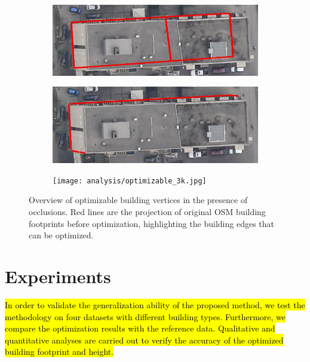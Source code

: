 \begin{figure}[H]
    \centering
       \begin{subfigure}[tbp]{0.43\columnwidth}
           \centering
           
           \includegraphics[width=\textwidth]{analysis/proj_3k.png}
           \caption[]{}
           {{\small }} 
           \label{fig:3a}
       \end{subfigure}
       \hfill
       \begin{subfigure}[tbp]{0.4\columnwidth}
           \centering
           \includegraphics[width=\textwidth]{analysis/optimizable_3k.png}
           \caption[]{}
           {{\small }}
           \label{fig:3b}
       \end{subfigure}
       \begin{subfigure}[tbp]{0.9\columnwidth}
           \centering
           \texttt{[image: analysis/optimizable\_3k.jpg]}
           \caption[]{}
           {{\small }}
           \label{fig:3c}
       \end{subfigure}
       \vspace{-12pt}
\caption{Overview of optimizable building vertices in the presence of occlusions. Red lines are the projection of original OSM building footprints before optimization, highlighting the building edges that can be optimized.}
       \label{fig:optimizable}
\end{figure}


\section{Experiments}\label{sec:exp}
\hl{In order to validate the generalization ability of the proposed method, we test the methodology on four datasets with different building types. Furthermore, we compare the optimization results with the reference data. Qualitative and quantitative analyses are carried out to verify the accuracy of the optimized building footprint and height.} 
